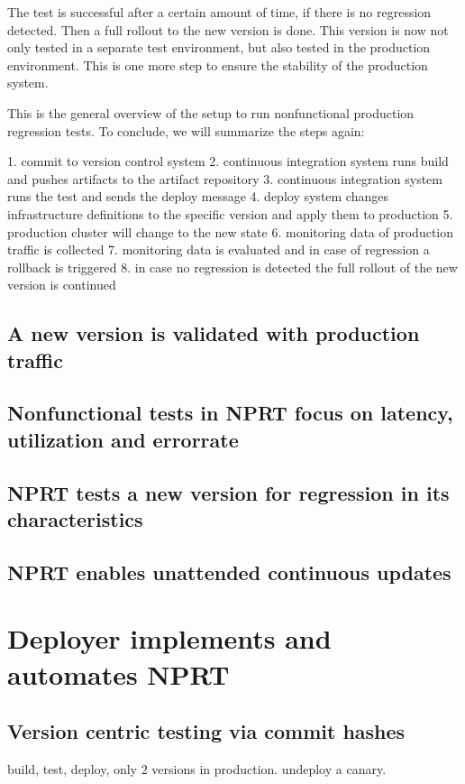 The test is successful after a certain amount of time, if there is no regression detected. Then a full rollout to the new version is done. This version is now not only tested in a separate test environment, but also tested in the production environment. This is one more step to ensure the stability of the production system.

This is the general overview of the setup to run nonfunctional production regression tests. To conclude, we will summarize the steps again:

1. commit to version control system
2. continuous integration system runs build and pushes artifacts to the artifact repository
3. continuous integration system runs the test and sends the deploy message
4. deploy system changes infrastructure definitions to the specific version and apply them to production
5. production cluster will change to the new state
6. monitoring data of production traffic is collected
7. monitoring data is evaluated and in case of regression a rollback is triggered
8. in case no regression is detected the full rollout of the new version is continued

\section{A new version is validated with production traffic}



\section{Nonfunctional tests in NPRT focus on latency, utilization and errorrate}
\section{NPRT tests a new version for regression in its characteristics}
\section{NPRT enables unattended continuous updates}

\chapter{Deployer implements and automates NPRT}
\section{Version centric testing via commit hashes}
build, test, deploy, only 2 versions in production. undeploy a canary.
